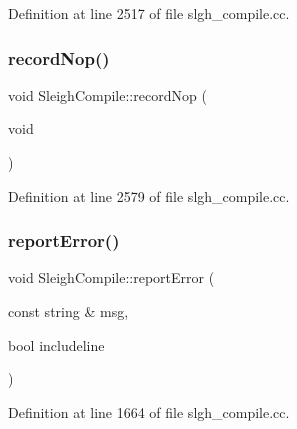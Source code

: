 Definition at line 2517 of file slgh\+\_\+compile.\+cc.

\mbox{\label{class_sleigh_compile_ab611793098a7d9c4cd867862e9d01701}} 
\subsubsection{\texorpdfstring{recordNop()}{recordNop()}}
{\footnotesize\ttfamily void Sleigh\+Compile\+::record\+Nop (\begin{DoxyParamCaption}\item[{void}]{ }\end{DoxyParamCaption})}



Definition at line 2579 of file slgh\+\_\+compile.\+cc.

\mbox{\label{class_sleigh_compile_a0ab2e290f1b8fcdeaa6e78d5d4e9e9ff}} 
\subsubsection{\texorpdfstring{reportError()}{reportError()}}
{\footnotesize\ttfamily void Sleigh\+Compile\+::report\+Error (\begin{DoxyParamCaption}\item[{const string \&}]{msg,  }\item[{bool}]{includeline }\end{DoxyParamCaption})}



Definition at line 1664 of file slgh\+\_\+compile.\+cc.

